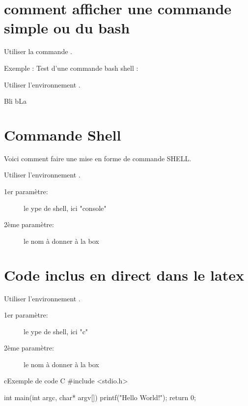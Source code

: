 \section{comment afficher une commande simple ou du bash}

Utiliser la commande .

Exemple : Test d'une commande bash shell  : 

Utiliser l'environnement .

Bli bLa


\section{Commande Shell}
\label{sec:shell}

Voici comment faire une mise en forme de commande SHELL.

Utiliser l'environnement .
\begin{description}
 \item[1er paramètre:] le ype de shell, ici "console"
 \item[2ème paramètre:] le nom à donner à la box
\end{description}



\section{Code inclus en direct dans le latex}

Utiliser l'environnement .
\begin{description}
 \item[1er paramètre:] le ype de shell, ici "c"
 \item[2ème paramètre:] le nom à donner à la box
\end{description}

\begin{sourcebox}{c}{Exemple de code C}
#include <stdio.h>

int main(int argc, char* argv[])
{
   printf("Hello World!\n");
   return 0;
}
\end{sourcebox}



